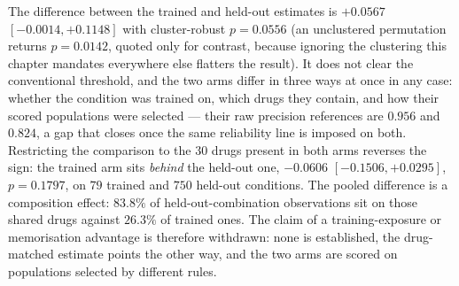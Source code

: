 The difference between the trained and held-out estimates is $+0.0567$
\nolinebreak[3]$[-0.0014, +0.1148]$ with cluster-robust $p = 0.0556$ (an unclustered permutation
returns $p = 0.0142$, quoted only for contrast, because ignoring the clustering this chapter
mandates everywhere else flatters the result). It does not clear the conventional threshold, and the
two arms differ in three ways at once in any case: whether the condition was trained on, which drugs
they contain, and how their scored populations were selected --- their raw precision references are
$0.956$ and $0.824$, a gap that closes once the same reliability line is imposed on both. Restricting the comparison to the $30$ drugs present in both arms reverses the sign: the
trained arm sits \emph{behind} the held-out one, $-0.0606$ \nolinebreak[3]$[-0.1506, +0.0295]$,
$p = 0.1797$, on $79$ trained and $750$ held-out conditions. The pooled difference is a composition
effect: $83.8\%$ of held-out-combination observations sit on those shared drugs against $26.3\%$ of
trained ones. The claim of a training-exposure or memorisation advantage is therefore withdrawn:
none is established, the drug-matched estimate points the other way, and the two arms are scored on
populations selected by different rules.

